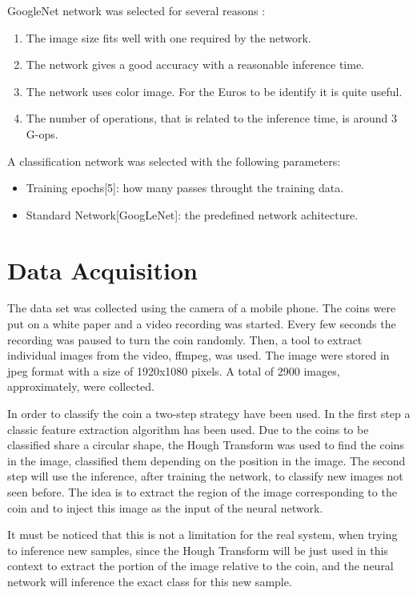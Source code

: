 \documentclass[10pt,journal,compsoc]{IEEEtran}
\begin{document}
GoogleNet network was selected for several reasons \cite{analysisdnn}:

\begin{enumerate}
	\item The image size fits well with one required by the network.
	\item The network gives a good accuracy with a reasonable inference time.
	\item The network uses color image. For the Euros to be identify it is quite useful.
	\item The number of operations, that is related to the inference time, is around 3 G-ops.
\end{enumerate}

A classification network was selected with the following parameters:

\begin{itemize}
	\item Training epochs[5]: how many passes throught the training data.
	\item Standard Network[GoogLeNet]: the predefined network achitecture.
\end{itemize}

		
\section{Data Acquisition}

The data set was collected using the camera of a mobile phone. The coins were put on a white paper and a video recording was started. Every few seconds the recording was paused to turn the coin randomly. Then, a tool to extract individual images from the video, ffmpeg, was used. The image were stored in jpeg format with a size of 1920x1080 pixels. A total of 2900 images, approximately, were collected.

In order to classify the coin a two-step strategy have been used. In the first step a classic feature extraction algorithm has been used. Due to the coins to be classified share a circular shape, the Hough Transform was used to find the coins in the image, classified them depending on the position in the image. The second step will use the inference, after training the network, to classify new images not seen before. The idea is to extract the region of the image corresponding to the coin and to inject this image as the input of the neural network.

It must be noticed that this is not a limitation for the real system, when trying to inference new samples, since the Hough Transform will be just used in this context to extract the portion of the image relative to the coin, and the neural network will inference the exact class for this new sample. 
\end{document}
